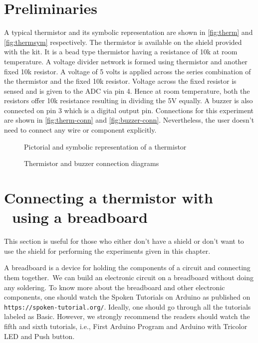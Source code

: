 \section{Preliminaries}
A typical thermistor and its symbolic representation are shown in
\ref{fig:therm} and \ref{fig:thermsym} respectively. The thermistor is
available on the shield provided with the kit.  It is a bead type
thermistor having a resistance of 10k at room temperature. A voltage
divider network is formed using thermistor and another fixed 10k
resistor. A voltage of 5 volts is applied across the series
combination of the thermistor and the fixed 10k resistor. Voltage
across the fixed resistor is sensed and is given to the ADC via pin
4. Hence at room temperature, both the resistors offer 10k resistance
resulting in dividing the 5V equally. A buzzer is also connected on
pin 3 which is a digital output pin.
Connections for this experiment are shown in \ref{fig:therm-conn}
and \ref{fig:buzzer-conn}.  Nevertheless, the user doesn't need to
connect any wire or component explicitly.


\begin{figure}
\centering
{} \hfill
{}
\caption{Pictorial and symbolic representation of a thermistor}
\end{figure}


\begin{figure}
\centering
{} \hfill
{}
\caption{Thermistor and buzzer connection diagrams}
\end{figure}

\section{Connecting a thermistor with \arduino\ using a breadboard}
This section is useful for those who either don't have a shield or don't want to use the shield
for performing the experiments given in this chapter. 

A breadboard is a device for holding the components of a circuit and connecting 
them together. We can build an electronic circuit on a breadboard without doing any 
soldering. To know more about the breadboard and other electronic components, 
one should watch the Spoken Tutorials on Arduino as published on
{\tt https://spoken-tutorial.org/}. Ideally, one should go through all the
tutorials labeled as Basic. However, we strongly recommend the readers should
watch the fifth and sixth tutorials, i.e., First Arduino Program and 
Arduino with Tricolor LED and Push button.

